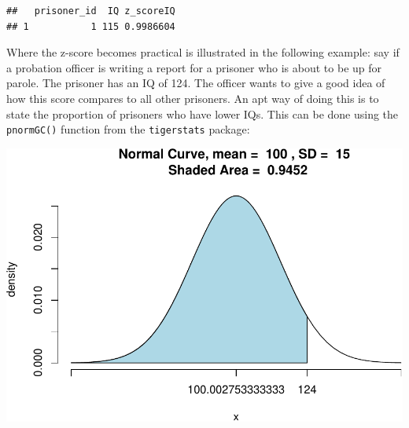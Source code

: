 \documentclass[
]{book}
\newenvironment{Shaded}{\begin{snugshade}}{\end{snugshade}}
\newcommand{\AttributeTok}[1]{\textcolor[rgb]{0.77,0.63,0.00}{#1}}
\newcommand{\CommentTok}[1]{\textcolor[rgb]{0.56,0.35,0.01}{\textit{#1}}}
\newcommand{\ConstantTok}[1]{\textcolor[rgb]{0.00,0.00,0.00}{#1}}
\newcommand{\DecValTok}[1]{\textcolor[rgb]{0.00,0.00,0.81}{#1}}
\newcommand{\FunctionTok}[1]{\textcolor[rgb]{0.00,0.00,0.00}{#1}}
\newcommand{\NormalTok}[1]{#1}
\newcommand{\OtherTok}[1]{\textcolor[rgb]{0.56,0.35,0.01}{#1}}
\newcommand{\SpecialCharTok}[1]{\textcolor[rgb]{0.00,0.00,0.00}{#1}}
\newcommand{\StringTok}[1]{\textcolor[rgb]{0.31,0.60,0.02}{#1}}
\begin{document}
\begin{verbatim}
##   prisoner_id  IQ z_scoreIQ
## 1           1 115 0.9986604
\end{verbatim}

Where the z-score becomes practical is illustrated in the following example: say if a probation officer is writing a report for a prisoner who is about to be up for parole. The prisoner has an IQ of 124. The officer wants to give a good idea of how this score compares to all other prisoners. An apt way of doing this is to state the proportion of prisoners who have lower IQs. This can be done using the \texttt{pnormGC()} function from the \texttt{tigerstats} package:

\begin{Shaded}
\end{Shaded}

\includegraphics{06-hypotheses_files/figure-latex/unnamed-chunk-10-1.pdf}
\end{document}
